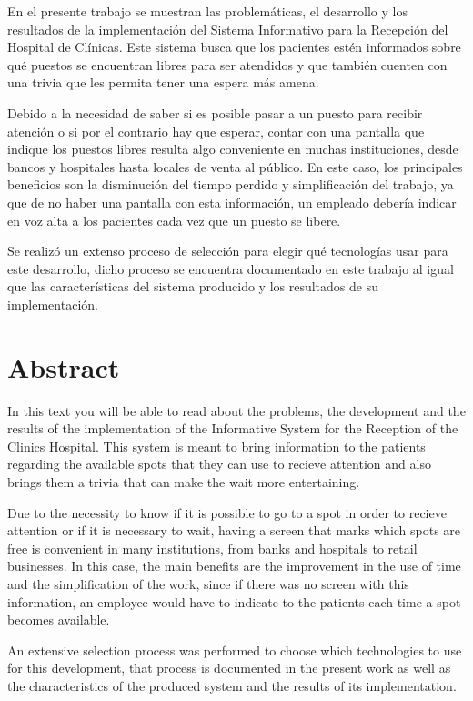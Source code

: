 \documentclass[twoside]{article}
\begin{document}
En el presente trabajo se muestran las problemáticas, el desarrollo y los resultados de la implementación del Sistema Informativo para la Recepción del Hospital de Clínicas. Este sistema busca que los pacientes estén informados sobre qué puestos se encuentran libres para ser atendidos y que también cuenten con una trivia que les permita tener una espera más amena.

Debido a la necesidad de saber si es posible pasar a un puesto para recibir atención o si por el contrario hay que esperar, contar con una pantalla que indique los puestos libres resulta algo conveniente en muchas instituciones, desde bancos y hospitales hasta locales de venta al público. En este caso, los principales beneficios son la disminución del tiempo perdido y simplificación del trabajo, ya que de no haber una pantalla con esta información, un empleado debería indicar en voz alta a los pacientes cada vez que un puesto se libere.

Se realizó un extenso proceso de selección para elegir qué tecnologías usar para este desarrollo, dicho proceso se encuentra documentado en este trabajo al igual que las características del sistema producido y los resultados de su implementación.
\newpage
\
\newpage
\section*{Abstract}

In this text you will be able to read about the problems, the development and the results of the implementation of the Informative System for the Reception of the Clinics Hospital. This system is meant to bring information to the patients regarding the available spots that they can use to recieve attention and also brings them a trivia that can make the wait more entertaining.

Due to the necessity to know if it is possible to go to a spot in order to recieve attention or if it is necessary to wait, having a screen that marks which spots are free is convenient in many institutions, from banks and hospitals to retail businesses. In this case, the main benefits are the improvement in the use of time and the simplification of the work, since if there was no screen with this information, an employee would have to indicate to the patients each time a spot becomes available.

An extensive selection process was performed to choose which technologies to use for this development, that process is documented in the present work as well as the characteristics of the produced system and the results of its implementation.
\newpage
\
\newpage
\end{document}
